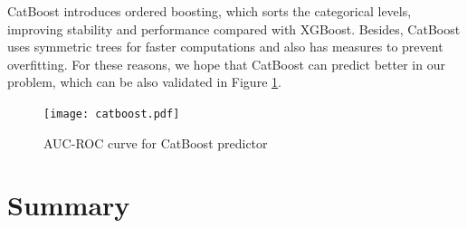 CatBoost introduces ordered boosting, which sorts the categorical levels, improving stability and performance compared with XGBoost. Besides, CatBoost uses symmetric trees for faster computations and also has measures to prevent overfitting. For these reasons, we hope that CatBoost can predict better in our problem, which can be also validated in Figure \ref{fig:catboost}.

\begin{figure}[htbp]
	\centering
	\texttt{[image: catboost.pdf]}
	\caption{AUC-ROC curve for CatBoost predictor}
	\label{fig:catboost}
\end{figure}



\section{Summary}
\label{sec:conc}







